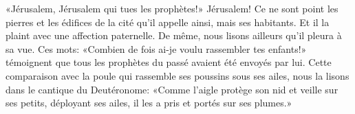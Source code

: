 «Jérusalem, Jérusalem qui tues les prophètes!»
Jérusalem! Ce ne sont point les pierres et les édifices de la cité qu'il appelle ainsi,
	mais ses habitants.
Et il la plaint avec une affection paternelle.
De même, nous lisons ailleurs qu'il pleura à sa vue.
Ces mots: «Combien de fois ai-je voulu rassembler tes enfants!»
	témoignent que tous les prophètes du passé avaient été envoyés par lui.
Cette comparaison avec la poule qui rassemble ses poussins sous ses ailes,
	nous la lisons dans le cantique du Deutéronome:
	«Comme l'aigle protège son nid et veille sur ses petits,
	déployant ses ailes, il les a pris et portés sur ses plumes.»
